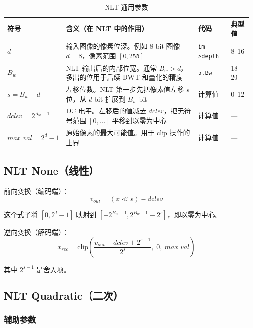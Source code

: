 \begin{table}[H]
\centering
\caption{NLT 通用参数}
\label{tab:nlt-params}
\begin{tabular}{@{}lp{4.5cm}ll@{}}
\toprule
符号 & 含义（在 NLT 中的作用） & 代码 & 典型值 \\
\midrule
$d$ & 输入图像的像素位深。例如 8-bit 图像 $d=8$，像素范围 $[0,255]$ & \texttt{im->depth} & 8--16 \\
$B_w$ & NLT 输出后的内部位宽。通常 $B_w > d$，多出的位用于后续 DWT 和量化的精度 & \texttt{p.Bw} & 18--20 \\
$s = B_w - d$ & 左移位数。NLT 第一步先把像素值左移 $s$ 位，从 $d$ bit 扩展到 $B_w$ bit & 计算值 & 0--12 \\
$\mathit{dclev} = 2^{B_w-1}$ & DC 电平。左移后的值减去 $\mathit{dclev}$，把无符号范围 $[0,\ldots]$ 平移到以零为中心 & 计算值 & --- \\
$\mathit{max\_val} = 2^d - 1$ & 原始像素的最大可能值。用于 clip 操作的上界 & 计算值 & --- \\
\bottomrule
\end{tabular}
\end{table}

\subsection{NLT None（线性）}

前向变换（编码端）：
\begin{equation}\label{eq:nlt-none-fwd}
v_{\mathit{out}} = (x \ll s) - \mathit{dclev}
\end{equation}

这个式子将 $[0, 2^d-1]$ 映射到 $[-2^{B_w-1}, 2^{B_w-1} - 2^s]$，即以零为中心。

逆向变换（解码端）：
\begin{equation}\label{eq:nlt-none-inv}
x_{\mathit{rec}} = \mathrm{clip}\!\left(\frac{v_{\mathit{out}} + \mathit{dclev} + 2^{s-1}}{2^s},\; 0,\; \mathit{max\_val}\right)
\end{equation}

其中 $2^{s-1}$ 是舍入项。

\subsection{NLT Quadratic（二次）}

\subsubsection{辅助参数}

